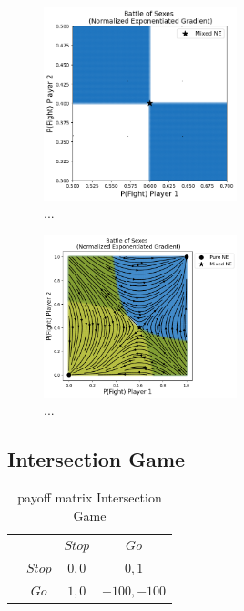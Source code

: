 \begin{figure}
    \centering
    \includegraphics[width=0.5\textwidth]{logos/BattleOfSexes4.png}
    \caption{...}
    \label{BattleOfSexes4}
\end{figure}

\begin{figure}
    \centering
    \includegraphics[width=0.5\textwidth]{logos/BattleOfSexes5.png}
    \caption{...}
    \label{BattleOfSexes5}
\end{figure}


\subsection{Intersection Game}\label{subsection:intersectionGame}

\begin{table}\centering
\setlength{\extrarowheight}{2pt}
\begin{tabular}{cc|c|c|}
  & \multicolumn{1}{c}{} & \multicolumn{1}{c}{$Stop$}  & \multicolumn{1}{c}{$Go$} \\\cline{3-4}
  & $Stop$ & $0,0$ & $0,1$ \\\cline{3-4}
  & $Go$ & $1,0$ & $-100,-100$ \\\cline{3-4}
\end{tabular}\caption{\label{tab:payoffIntersection}payoff matrix Intersection Game}
\end{table}

